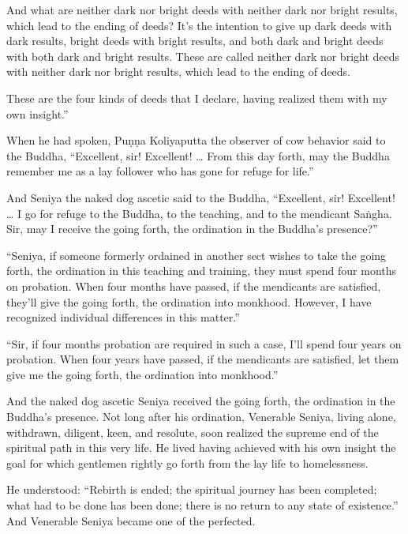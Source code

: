 \documentclass[12pt,openany]{book}%
\begin{document}
And what are neither dark nor bright deeds with neither dark nor bright results, which lead to the ending of deeds? It’s the intention to give up dark deeds with dark results, bright deeds with bright results, and both dark and bright deeds with both dark and bright results. These are called neither dark nor bright deeds with neither dark nor bright results, which lead to the ending of deeds. 

These are the four kinds of deeds that I declare, having realized them with my own insight.” 

When he had spoken, \textsanskrit{Puṇṇa} Koliyaputta the observer of cow behavior said to the Buddha, “Excellent, sir! Excellent! … From this day forth, may the Buddha remember me as a lay follower who has gone for refuge for life.” 

And Seniya the naked dog ascetic said to the Buddha, “Excellent, sir! Excellent! … I go for refuge to the Buddha, to the teaching, and to the mendicant \textsanskrit{Saṅgha}. Sir, may I receive the going forth, the ordination in the Buddha’s presence?” 

“Seniya, if someone formerly ordained in another sect wishes to take the going forth, the ordination in this teaching and training, they must spend four months on probation. When four months have passed, if the mendicants are satisfied, they’ll give the going forth, the ordination into monkhood. However, I have recognized individual differences in this matter.” 

“Sir, if four months probation are required in such a case, I’ll spend four years on probation. When four years have passed, if the mendicants are satisfied, let them give me the going forth, the ordination into monkhood.” 

And the naked dog ascetic Seniya received the going forth, the ordination in the Buddha’s presence. Not long after his ordination, Venerable Seniya, living alone, withdrawn, diligent, keen, and resolute, soon realized the supreme end of the spiritual path in this very life. He lived having achieved with his own insight the goal for which gentlemen rightly go forth from the lay life to homelessness. 

He understood: “Rebirth is ended; the spiritual journey has been completed; what had to be done has been done; there is no return to any state of existence.” And Venerable Seniya became one of the perfected. 
\end{document}
